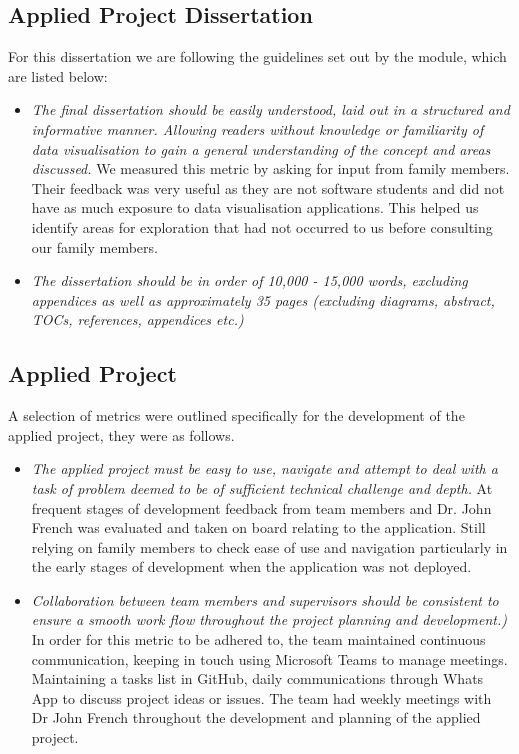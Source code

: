 \vspace{5mm} %

\subsection{Applied Project Dissertation}
For this dissertation we are following the guidelines set out by the module, which are listed below:

\begin{itemize}

    \item \emph{The final dissertation should be easily understood, laid out in a structured and informative manner. Allowing readers without knowledge or familiarity of data visualisation to gain a general understanding of the concept and areas discussed.} We measured this metric by asking for input from family members. Their feedback was very useful as they are not software students and did not have as much exposure to data visualisation applications. This helped us identify areas for exploration that had not occurred to us before consulting our family members.

    \item \emph{The  dissertation should be in order of 10,000 - 15,000 words, excluding appendices as well as approximately 35 pages (excluding diagrams, abstract, TOCs, references, appendices etc.)}

\end{itemize}

\subsection{Applied Project}
A selection of metrics were outlined specifically for the development of the applied project, they were as follows.

\begin{itemize}

    \item \emph{The applied project must be easy to use, navigate and attempt to deal with a task of problem deemed to be of sufficient technical challenge and depth.} At frequent stages of development feedback from team members and Dr. John French was evaluated and taken on board relating to the application. Still relying on family members to check ease of use and navigation particularly in the early stages of development when the application was not deployed.

    \item \emph{Collaboration between team members and supervisors should be consistent to ensure a smooth work flow throughout the project planning and development.)} In order for this metric to be adhered to, the team maintained continuous communication, keeping in touch using Microsoft Teams to manage meetings. Maintaining a tasks list in GitHub, daily communications through Whats App to discuss project ideas or issues.
    The team had weekly meetings with Dr John French throughout the development and planning of the applied project.

\end{itemize}


